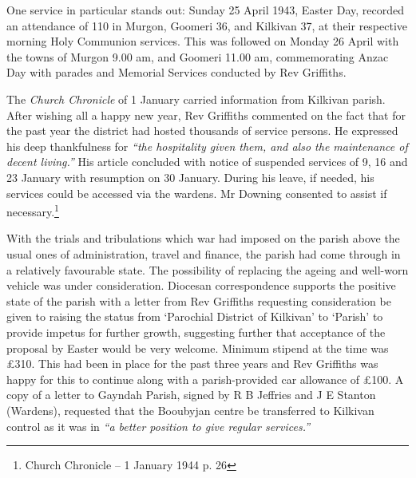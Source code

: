 One service in particular stands out: Sunday 25 April 1943, Easter Day, recorded an attendance of 110 in Murgon, Goomeri 36, and Kilkivan 37, at their respective morning Holy Communion services. This was followed on Monday 26 April with the towns of Murgon 9.00 am, and Goomeri 11.00 am, commemorating Anzac Day with parades and Memorial Services conducted by Rev Griffiths.



The \emph{Church Chronicle} of 1 January carried information from Kilkivan parish. After wishing all a happy new year, Rev Griffiths commented on the fact that for the past year the district had hosted thousands of service persons. He expressed his deep thankfulness for \emph{``the hospitality given them, and also the maintenance of decent living.''} His article concluded with notice of suspended services of 9, 16 and 23 January with resumption on 30 January. During his leave, if needed, his services could be accessed via the wardens. Mr Downing consented to assist if necessary.\footnote{Church Chronicle -- 1 January 1944 p. 26}


With the trials and tribulations which war had imposed on the parish above the usual ones of administration, travel and finance, the parish had come through in a relatively favourable state. The possibility of replacing the ageing and well-worn vehicle was under consideration. Diocesan correspondence supports the positive state of the parish with a letter from Rev Griffiths requesting consideration be given to raising the status from `Parochial District of Kilkivan' to `Parish' to provide impetus for further growth, suggesting further that acceptance of the proposal by Easter would be very welcome. Minimum stipend at the time was \pounds310. This had been in place for the past three years and Rev Griffiths was happy for this to continue along with a parish-provided car allowance of \pounds100. A copy of a letter to Gayndah Parish, signed by R B Jeffries and J E Stanton (Wardens), requested that the Booubyjan centre be transferred to Kilkivan control as it was in \emph{``a better position to give regular services.''}



